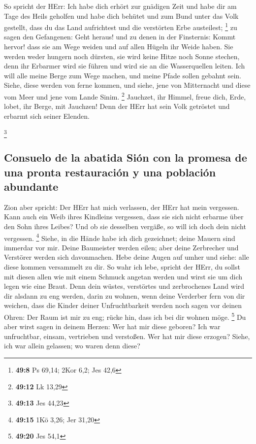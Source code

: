  So spricht der HErr: Ich habe dich erhört zur gnädigen
Zeit und habe dir am Tage des Heils geholfen und habe dich behütet und
zum Bund unter das Volk gestellt, dass du das Land aufrichtest und die
verstörten Erbe austeilest; \footnote{\textbf{49:8} Ps 69,14; 2Kor 6,2;
  Jes 42,6}  zu sagen den Gefangenen: Geht heraus! und zu
denen in der Finsternis: Kommt hervor! dass sie am Wege weiden und auf
allen Hügeln ihr Weide haben.  Sie werden weder hungern
noch dürsten, sie wird keine Hitze noch Sonne stechen, denn ihr Erbarmer
wird sie führen und wird sie an die Wasserquellen leiten.
 Ich will alle meine Berge zum Wege machen, und meine
Pfade sollen gebahnt sein.  Siehe, diese werden von ferne
kommen, und siehe, jene von Mitternacht und diese vom Meer und jene vom
Lande Sinim. \footnote{\textbf{49:12} Lk 13,29} 
Jauchzet, ihr Himmel, freue dich, Erde, lobet, ihr Berge, mit Jauchzen!
Denn der HErr hat sein Volk getröstet und erbarmt sich seiner Elenden.

\footnote{\textbf{49:13} Jes 44,23}

\hypertarget{consuelo-de-la-abatida-siuxf3n-con-la-promesa-de-una-pronta-restauraciuxf3n-y-una-poblaciuxf3n-abundante}{%
\subsection{Consuelo de la abatida Sión con la promesa de una pronta
restauración y una población
abundante}\label{consuelo-de-la-abatida-siuxf3n-con-la-promesa-de-una-pronta-restauraciuxf3n-y-una-poblaciuxf3n-abundante}}

 Zion aber spricht: Der HErr hat mich verlassen, der HErr
hat mein vergessen.  Kann auch ein Weib ihres Kindleins
vergessen, dass sie sich nicht erbarme über den Sohn ihres Leibes? Und
ob sie desselben vergäße, so will ich doch dein nicht vergessen.
\footnote{\textbf{49:15} 1Kö 3,26; Jer 31,20}  Siehe, in
die Hände habe ich dich gezeichnet; deine Mauern sind immerdar vor mir.
 Deine Baumeister werden eilen; aber deine Zerbrecher und
Verstörer werden sich davonmachen.  Hebe deine Augen auf
umher und siehe: alle diese kommen versammelt zu dir. So wahr ich lebe,
spricht der HErr, du sollst mit diesen allen wie mit einem Schmuck
angetan werden und wirst sie um dich legen wie eine Braut.
 Denn dein wüstes, verstörtes und zerbrochenes Land wird
dir alsdann zu eng werden, darin zu wohnen, wenn deine Verderber fern
von dir weichen,  dass die Kinder deiner Unfruchtbarkeit
werden noch sagen vor deinen Ohren: Der Raum ist mir zu eng; rücke hin,
dass ich bei dir wohnen möge. \footnote{\textbf{49:20} Jes 54,1}
 Du aber wirst sagen in deinem Herzen: Wer hat mir diese
geboren? Ich war unfruchtbar, einsam, vertrieben und verstoßen. Wer hat
mir diese erzogen? Siehe, ich war allein gelassen; wo waren denn diese?

